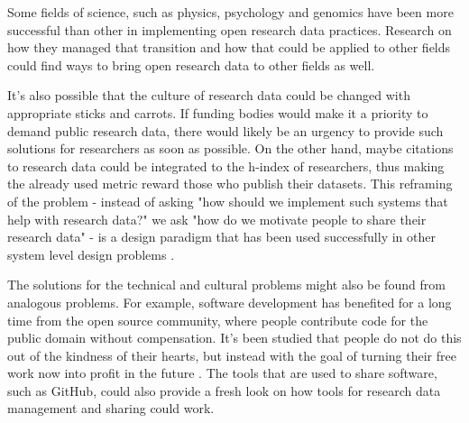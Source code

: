 Some fields of science, such as physics, psychology and genomics have been
more successful than other in implementing open research data practices.
Research on how they managed that transition and how that could be applied
to other fields could find ways to bring open research data to other
fields as well.

It's also possible that the culture of research data could be changed with
appropriate sticks and carrots. If funding bodies would make it a priority
to demand public research data, there would likely be an urgency to provide
such solutions for researchers as soon as possible. On the other hand, maybe
citations to research data could be integrated to the h-index of researchers,
thus making the already used metric reward those who publish their datasets.
This reframing of the problem - instead of asking "how should we implement
such systems that help with research data?" we ask "how do we motivate people
to share their research data" - is a design paradigm that has been used
successfully in other system level design problems \cite{dorst2015frame}.

The solutions for the technical and cultural problems might also be found
from analogous problems. For example, software development has benefited for
a long time from the open source community, where people contribute code for
the public domain without compensation. It's been studied that people do not
do this out of the kindness of their hearts, but instead with the goal of
turning their free work now into profit in the future
\cite{DBLP:conf/hicss/HarsO01}. The tools that are used to share software,
such as GitHub, could also provide a fresh look on how tools for research
data management and sharing could work.

\iffalse
In this chapter we'll discuss the findings, methods and such in a good
scientific manner.

At some point I want to discuss the analogue of software open source community
and how that works - how we should make people proud of making good, usable
datasets and sharing them.

\cite{DBLP:conf/hicss/HarsO01} is about the motivations behind working on open
source software - could be used for analogue for open data.

\cite{dorst2015frame} is the Kees Dorst book about reframing problems, which in
this case would be taking the technical problem of sharing reserch data, which
is not the actual problem, and reframing it as the problem on how to motivat
people to to share their data.
\fi
